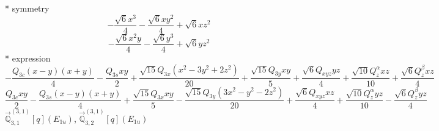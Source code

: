 \documentclass[fleqn,8pt]{jsarticle}
\begin{document}
\noindent\quad ** symmetry
\begin{dmath*}
- \frac{\sqrt{6} x^{3}}{4} - \frac{\sqrt{6} x y^{2}}{4} + \sqrt{6} x z^{2}
\end{dmath*}
\begin{dmath*}
- \frac{\sqrt{6} x^{2} y}{4} - \frac{\sqrt{6} y^{3}}{4} + \sqrt{6} y z^{2}
\end{dmath*}
\noindent\quad ** expression
\begin{dmath*}
- \frac{Q_{3c} \left(x - y\right) \left(x + y\right)}{4} - \frac{Q_{3s} x y}{2} + \frac{\sqrt{15} Q_{3x} \left(x^{2} - 3 y^{2} + 2 z^{2}\right)}{20} + \frac{\sqrt{15} Q_{3y} x y}{5} + \frac{\sqrt{6} Q_{xyz} y z}{4} + \frac{\sqrt{10} Q_{z}^{\alpha} x z}{10} + \frac{\sqrt{6} Q_{z}^{\beta} x z}{4}
\end{dmath*}
\begin{dmath*}
\frac{Q_{3c} x y}{2} - \frac{Q_{3s} \left(x - y\right) \left(x + y\right)}{4} + \frac{\sqrt{15} Q_{3x} x y}{5} - \frac{\sqrt{15} Q_{3y} \left(3 x^{2} - y^{2} - 2 z^{2}\right)}{20} + \frac{\sqrt{6} Q_{xyz} x z}{4} + \frac{\sqrt{10} Q_{z}^{\alpha} y z}{10} - \frac{\sqrt{6} Q_{z}^{\beta} y z}{4}
\end{dmath*}
\noindent\quad $\vec{\mathbb{Q}}_{3,1}^{(3,1)}[q](E_{1u})$, $\vec{\mathbb{Q}}_{3,2}^{(3,1)}[q](E_{1u})$
\end{document}
